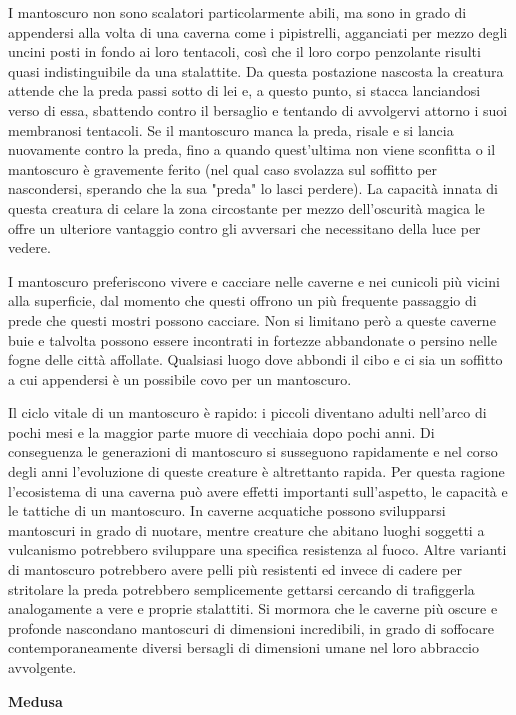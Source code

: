 \begin{multicols}{2}
I mantoscuro non sono scalatori particolarmente abili, ma sono in grado di appendersi alla volta di una caverna come i pipistrelli, agganciati per mezzo degli uncini posti in fondo ai loro tentacoli, così che il loro corpo penzolante risulti quasi indistinguibile da una stalattite. Da questa postazione nascosta la creatura attende che la preda passi sotto di lei e, a questo punto, si stacca lanciandosi verso di essa, sbattendo contro il bersaglio e tentando di avvolgervi attorno i suoi membranosi tentacoli. Se il mantoscuro manca la preda, risale e si lancia nuovamente contro la preda, fino a quando quest'ultima non viene sconfitta o il mantoscuro è gravemente ferito (nel qual caso svolazza sul soffitto per nascondersi, sperando che la sua "preda" lo lasci perdere). La capacità innata di questa creatura di celare la zona circostante per mezzo dell'oscurità magica le offre un ulteriore vantaggio contro gli avversari che necessitano della luce per vedere.

I mantoscuro preferiscono vivere e cacciare nelle caverne e nei cunicoli più vicini alla superficie, dal momento che questi offrono un più frequente passaggio di prede che questi mostri possono cacciare. Non si limitano però a queste caverne buie e talvolta possono essere incontrati in fortezze abbandonate o persino nelle fogne delle città affollate. Qualsiasi luogo dove abbondi il cibo e ci sia un soffitto a cui appendersi è un possibile covo per un mantoscuro.

Il ciclo vitale di un mantoscuro è rapido: i piccoli diventano adulti nell'arco di pochi mesi e la maggior parte muore di vecchiaia dopo pochi anni. Di conseguenza le generazioni di mantoscuro si susseguono rapidamente e nel corso degli anni l'evoluzione di queste creature è altrettanto rapida. Per questa ragione l'ecosistema di una caverna può avere effetti importanti sull'aspetto, le capacità e le tattiche di un mantoscuro. In caverne acquatiche possono svilupparsi mantoscuri in grado di nuotare, mentre creature che abitano luoghi soggetti a vulcanismo potrebbero sviluppare una specifica resistenza al fuoco. Altre varianti di mantoscuro potrebbero avere pelli più resistenti ed invece di cadere per stritolare la preda potrebbero semplicemente gettarsi cercando di trafiggerla analogamente a vere e proprie stalattiti. Si mormora che le caverne più oscure e profonde nascondano mantoscuri di dimensioni incredibili, in grado di soffocare contemporaneamente diversi bersagli di dimensioni umane nel loro abbraccio avvolgente.


\medskip{}\textbf{Medusa}


\end{multicols}
